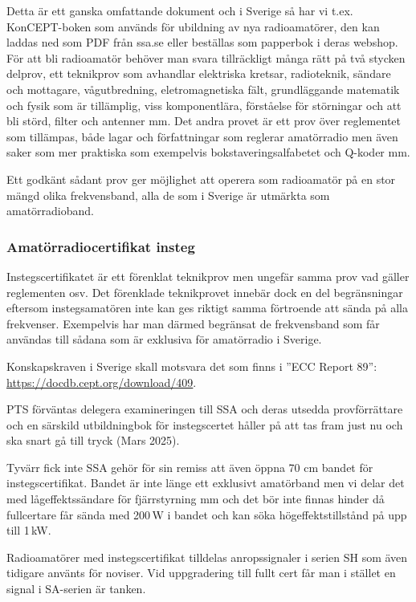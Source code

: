 Detta är ett ganska omfattande dokument och i Sverige så har vi t.ex.
KonCEPT-boken som används för ubildning av nya radioamatörer, den kan laddas ned
som PDF från ssa.se eller beställas som papperbok i deras webshop. För att bli
radioamatör behöver man svara tillräckligt många rätt på två stycken delprov,
ett teknikprov som avhandlar elektriska kretsar, radioteknik, sändare och
mottagare, vågutbredning, eletromagnetiska fält, grundläggande matematik och
fysik som är tillämplig, viss komponentlära, förståelse för störningar och att
bli störd, filter och antenner mm. Det andra provet är ett prov över reglementet
som tillämpas, både lagar och författningar som reglerar amatörradio men även
saker som mer praktiska som exempelvis bokstaveringsalfabetet och Q-koder mm.

Ett godkänt sådant prov ger möjlighet att operera som radioamatör på
en stor mängd olika frekvensband, alla de som i Sverige är utmärkta
som amatörradioband.

\subsubsection{Amatörradiocertifikat insteg}
\label{sec:instegscertifikat}

Instegscertifikatet är ett förenklat teknikprov men ungefär samma prov vad
gäller reglementen osv. Det förenklade teknikprovet innebär dock en del
begränsningar eftersom instegsamatören inte kan ges riktigt samma förtroende att
sända på alla frekvenser. Exempelvis har man därmed begränsat de frekvensband
som får användas till sådana som är exklusiva för amatörradio i Sverige.

Konskapskraven i Sverige skall motsvara det som finns i ''ECC Report 89'': \\
\url{https://docdb.cept.org/download/409}.

PTS förväntas delegera examineringen till SSA och deras utsedda provförrättare
och en särskild utbildningbok för instegscertet håller på att tas fram just nu
och ska snart gå till tryck (Mars 2025).

Tyvärr fick inte SSA gehör för sin remiss att även öppna 70 cm bandet för
instegscertifikat. Bandet är inte länge ett exklusivt amatörband men vi delar
det med lågeffektssändare för fjärrstyrning mm och det bör inte finnas hinder då
fullcertare får sända med 200\,W i bandet och kan söka högeffektstillstånd på
upp till 1\,kW.

Radioamatörer med instegscertifikat tilldelas anropssignaler i serien SH som
även tidigare använts för noviser. Vid uppgradering till fullt cert får man i
stället en signal i SA-serien är tanken.

